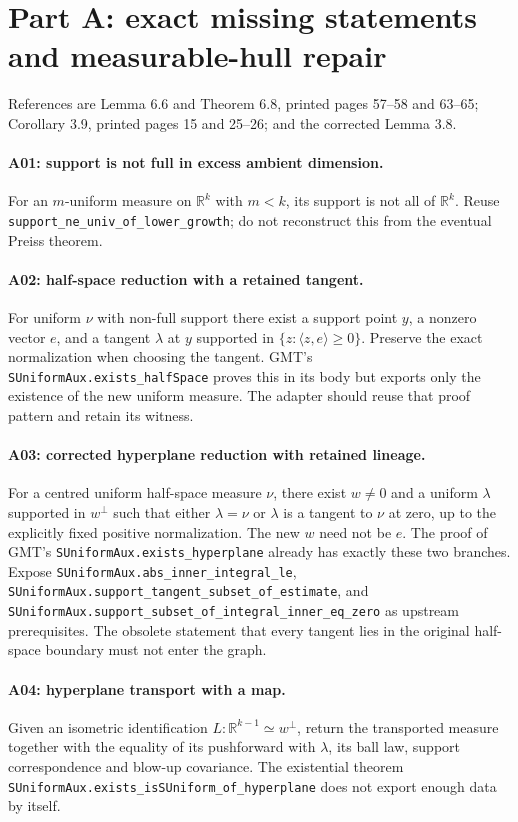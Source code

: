 \section{Part A: exact missing statements and measurable-hull repair}
References are Lemma 6.6 and Theorem 6.8, printed pages 57--58 and 63--65;
Corollary 3.9, printed pages 15 and 25--26; and the corrected Lemma 3.8.

\paragraph{A01: support is not full in excess ambient dimension.}
For an $m$-uniform measure on $\mathbb R^k$ with $m<k$, its support is not all
of $\mathbb R^k$. Reuse \texttt{support\_ne\_univ\_of\_lower\_growth}; do
not reconstruct this from the eventual Preiss theorem.

\paragraph{A02: half-space reduction with a retained tangent.}
For uniform $\nu$ with non-full support there exist a support point $y$,
a nonzero vector $e$, and a tangent $\lambda$ at $y$ supported in
$\{z:\langle z,e\rangle\geq0\}$. Preserve the exact normalization when
choosing the tangent. GMT's \texttt{SUniformAux.exists\_halfSpace} proves
this in its body but exports only the existence of the new uniform measure.
The adapter should reuse that proof pattern and retain its witness.

\paragraph{A03: corrected hyperplane reduction with retained lineage.}
For a centred uniform half-space measure $\nu$, there exist $w\ne0$ and a
uniform $\lambda$ supported in $w^\perp$ such that either $\lambda=\nu$
or $\lambda$ is a tangent to $\nu$ at zero, up to the explicitly fixed
positive normalization. The new $w$ need not be $e$.
The proof of GMT's \texttt{SUniformAux.exists\_hyperplane} already has
exactly these two branches. Expose
\texttt{SUniformAux.abs\_inner\_integral\_le},
\texttt{SUniformAux.support\_tangent\_subset\_of\_estimate}, and
\texttt{SUniformAux.support\_subset\_of\_integral\_inner\_eq\_zero}
as upstream prerequisites. The obsolete statement that every tangent lies in
the original half-space boundary must not enter the graph.

\paragraph{A04: hyperplane transport with a map.}
Given an isometric identification $L:\mathbb R^{k-1}\simeq w^\perp$, return
the transported measure together with the equality of its pushforward with
$\lambda$, its ball law, support correspondence and blow-up covariance.
The existential theorem
\texttt{SUniformAux.exists\_isSUniform\_of\_hyperplane}
does not export enough data by itself.

